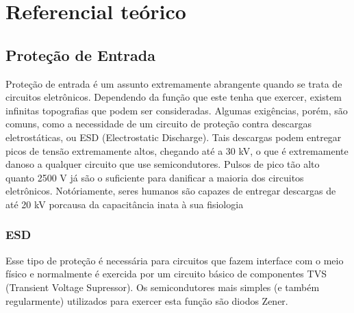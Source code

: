 \chapter{Referencial te\'orico}\label{cap:referencialTeorico}


\section{Proteção de Entrada}\label{sec:InputProtection}

Proteção de entrada é um assunto extremamente abrangente quando se trata de circuitos eletrônicos. Dependendo da função que este tenha que exercer, existem infinitas topografias que podem ser consideradas. Algumas exigências, porém, são comuns, como a necessidade de um circuito de proteção contra descargas eletrostáticas, ou ESD (Electrostatic Discharge). Tais descargas podem entregar picos de tensão extremamente altos, chegando até a 30 kV, o que é extremamente danoso a qualquer circuito que use semicondutores. Pulsos de pico tão alto quanto 2500 V já são o suficiente para danificar a maioria dos circuitos eletrônicos. Notóriamente, seres humanos são capazes de entregar descargas de até 20 kV porcausa da capacitância inata à sua fisiologia %

    \subsection{ESD}\label{subsec:electrostaticDischarge}
    Esse tipo de proteção é necessária para circuitos que fazem interface com o meio físico e normalmente é exercida por um circuito básico de componentes TVS (Transient Voltage Supressor). Os semicondutores mais simples (e também regularmente) utilizados para exercer esta função são diodos Zener.
    
